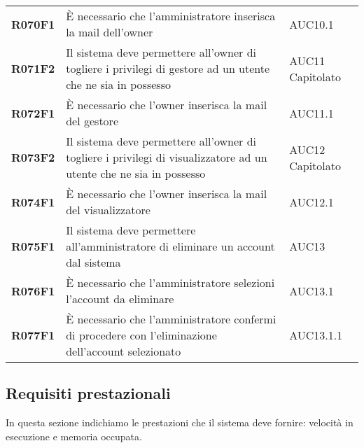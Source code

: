 \documentclass[../analisi-dei-requisiti.tex]{subfiles}
\begin{document}
\begin{longtable}[H]{>{\centering\bfseries}m{3cm} >{\centering}m{10cm} >{\centering\arraybackslash}m{3cm}}
  R070F1                  & È necessario che l'amministratore inserisca la mail dell'owner                                                                                                                     & AUC10.1                       \\
  R071F2                  & Il sistema deve permettere all'owner di togliere i privilegi di gestore ad un utente che ne sia in possesso                                                                        & AUC11 Capitolato              \\
  R072F1                  & È necessario che l'owner inserisca la mail del gestore                                                                                                                             & AUC11.1                       \\
  R073F2                  & Il sistema deve permettere all'owner di togliere i privilegi di visualizzatore ad un utente che ne sia in possesso                                                                 & AUC12 Capitolato              \\
  R074F1                  & È necessario che l'owner inserisca la mail del visualizzatore                                                                                                                      & AUC12.1                       \\
  R075F1                  & Il sistema deve permettere all'amministratore di eliminare un account dal sistema                                                                                                  & AUC13                         \\
  R076F1                  & È necessario che l'amministratore selezioni l'account da eliminare                                                                                                                 & AUC13.1                       \\
  R077F1                  & È necessario che l'amministratore confermi di procedere con l'eliminazione dell'account selezionato                                                                                & AUC13.1.1                     \\
\end{longtable}

\newpage
\subsection{Requisiti prestazionali}%
\label{sub:requisiti_prestazionali}
In questa sezione indichiamo le prestazioni che il sistema deve fornire: velocità in esecuzione e memoria occupata.
\end{document}
